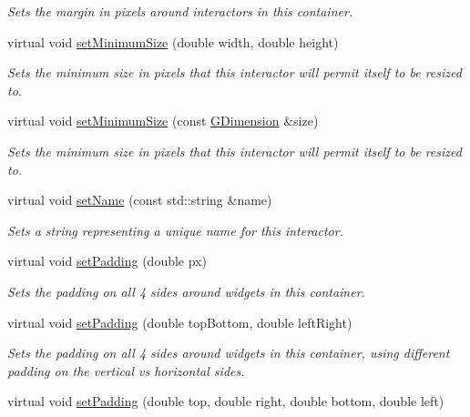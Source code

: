 \begin{DoxyCompactItemize}
\begin{DoxyCompactList}\small\item\em Sets the margin in pixels around interactors in this container. \end{DoxyCompactList}\item 
virtual void \mbox{\hyperlink{classGInteractor_a0cf428e207b7f22cc08138a90b1b87b2}{set\+Minimum\+Size}} (double width, double height)
\begin{DoxyCompactList}\small\item\em Sets the minimum size in pixels that this interactor will permit itself to be resized to. \end{DoxyCompactList}\item 
virtual void \mbox{\hyperlink{classGInteractor_a3b1046117ac6cb7abe467e00ba8a81f4}{set\+Minimum\+Size}} (const \mbox{\hyperlink{classGDimension}{G\+Dimension}} \&size)
\begin{DoxyCompactList}\small\item\em Sets the minimum size in pixels that this interactor will permit itself to be resized to. \end{DoxyCompactList}\item 
virtual void \mbox{\hyperlink{classGInteractor_a9d3a2685df23b5e7cbf59c19c4a1f9b5}{set\+Name}} (const std\+::string \&name)
\begin{DoxyCompactList}\small\item\em Sets a string representing a unique name for this interactor. \end{DoxyCompactList}\item 
virtual void \mbox{\hyperlink{classGContainer_a81b293e913c083a544af96f031668225}{set\+Padding}} (double px)
\begin{DoxyCompactList}\small\item\em Sets the padding on all 4 sides around widgets in this container. \end{DoxyCompactList}\item 
virtual void \mbox{\hyperlink{classGContainer_a76dc599dd8828f0ab534ab0d1b0c5ef8}{set\+Padding}} (double top\+Bottom, double left\+Right)
\begin{DoxyCompactList}\small\item\em Sets the padding on all 4 sides around widgets in this container, using different padding on the vertical vs horizontal sides. \end{DoxyCompactList}\item 
virtual void \mbox{\hyperlink{classGContainer_a9adbf36914b59c2ed3ed9aebe7adfc7e}{set\+Padding}} (double top, double right, double bottom, double left)

\end{DoxyCompactItemize}
